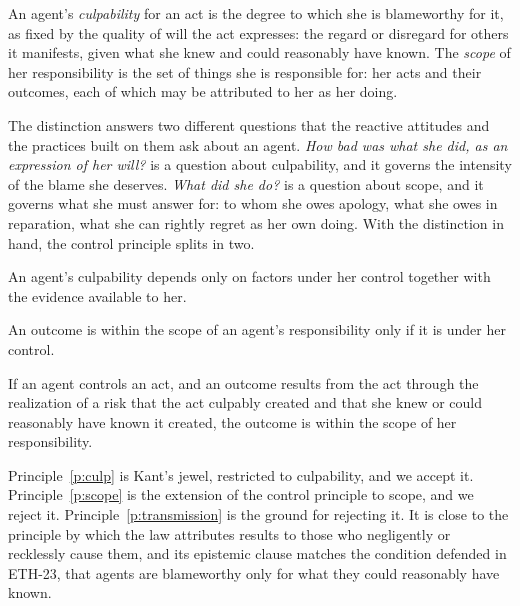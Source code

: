 \documentclass{situationist-preprint}
\begin{document}
\begin{definition}\label{d:two}
An agent's \emph{culpability} for an act is the degree to which she is blameworthy for it, as fixed by the quality of will the act expresses: the regard or disregard for others it manifests, given what she knew and could reasonably have known. The \emph{scope} of her responsibility is the set of things she is responsible for: her acts and their outcomes, each of which may be attributed to her as her doing.
\end{definition}

The distinction answers two different questions that the reactive attitudes \citep{Strawson1962} and the practices built on them ask about an agent. \emph{How bad was what she did, as an expression of her will?} is a question about culpability, and it governs the intensity of the blame she deserves. \emph{What did she do?} is a question about scope, and it governs what she must answer for: to whom she owes apology, what she owes in reparation, what she can rightly regret as her own doing. With the distinction in hand, the control principle splits in two.

\begin{principle}\label{p:culp}
An agent's culpability depends only on factors under her control together with the evidence available to her.
\end{principle}

\begin{principle}\label{p:scope}
An outcome is within the scope of an agent's responsibility only if it is under her control.
\end{principle}

\begin{principle}[Transmission]\label{p:transmission}
If an agent controls an act, and an outcome results from the act through the realization of a risk that the act culpably created and that she knew or could reasonably have known it created, the outcome is within the scope of her responsibility.
\end{principle}

Principle~\ref{p:culp} is Kant's jewel, restricted to culpability, and we accept it. Principle~\ref{p:scope} is the extension of the control principle to scope, and we reject it. Principle~\ref{p:transmission} is the ground for rejecting it. It is close to the principle by which the law attributes results to those who negligently or recklessly cause them, and its epistemic clause matches the condition defended in ETH-23, that agents are blameworthy only for what they could reasonably have known.
\end{document}
